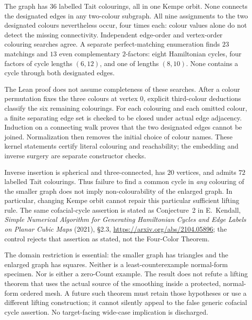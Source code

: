 The graph has $36$ labelled Tait colourings, all in one Kempe orbit.
None connects the designated edges in any two-colour subgraph.
All nine assignments to the two designated colours nevertheless occur,
four times each: colour values alone do not detect the missing
connectivity. Independent edge-order and vertex-order colouring
searches agree. A separate perfect-matching enumeration finds $23$
matchings and $13$ even complementary $2$-factors: eight Hamiltonian
cycles, four factors of cycle lengths $(6,12)$, and one of lengths
$(8,10)$. None contains a cycle through both designated edges.

The Lean proof does not assume completeness of these searches.
After a colour permutation fixes the three colours at vertex $0$,
explicit third-colour deductions classify the six remaining colourings.
For each colouring and each omitted colour, a finite separating edge
set is checked to be closed under actual edge adjacency. Induction on
a connecting walk proves that the two designated edges cannot be
joined. Normalization then removes the initial choice of colour names.
These kernel statements certify literal colouring and reachability;
the embedding and inverse surgery are separate constructor checks.

Inverse insertion is spherical and three-connected, has $20$ vertices,
and admits $72$ labelled Tait colourings. Thus failure to find a common
cycle in \emph{any} colouring of the smaller graph does not imply
non-colourability of the enlarged graph. In particular, changing Kempe
orbit cannot repair this particular sufficient lifting rule.
The same cofacial-cycle assertion is stated as Conjecture~2 in
E.~Kendall, \emph{Simple Numerical Algorithm for Generating Hamiltonian
Cycles and Edge Labels on Planar Cubic Maps} (2021), \S2.3,
\url{https://arxiv.org/abs/2104.05896}; the control rejects that assertion
as stated, not the Four-Color Theorem.

The domain restriction is essential: the smaller graph has triangles
and the enlarged graph has squares. Neither is a least-counterexample
normal-form specimen. Nor is either a zero-Count example. The result
does not refute a lifting theorem that uses the actual source of the
smoothing inside a protected, normal-form ordered mesh. A future such
theorem must retain those hypotheses or use a different lifting
construction; it cannot silently appeal to the false generic cofacial
cycle assertion. No target-facing wide-case implication is discharged.

